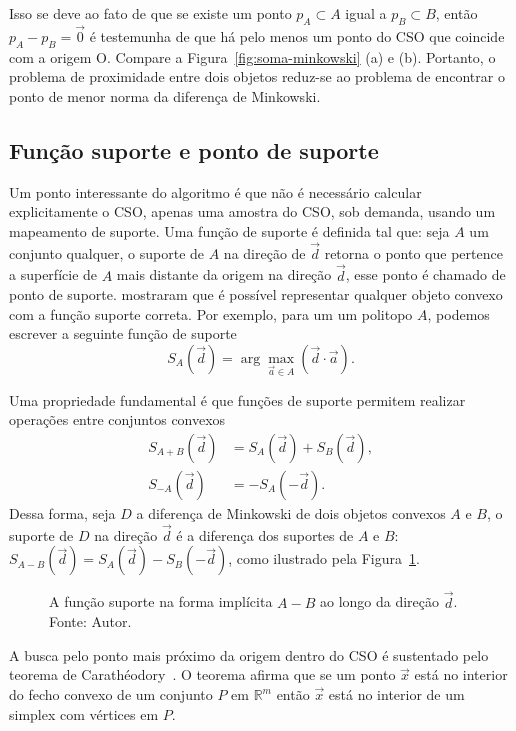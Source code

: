 Isso se deve ao fato de que se existe um ponto $p_A \subset A$ igual a $p_B \subset B$, então $p_A - p_B = \vec 0$ é testemunha de que há pelo menos um ponto do CSO que coincide com a origem O. Compare a Figura~\ref{fig:soma-minkowski} (a) e (b). Portanto, o problema de proximidade entre dois objetos reduz-se ao problema de encontrar o ponto de menor norma da diferença de Minkowski.

\subsection*{Função suporte e ponto de suporte}

Um ponto interessante do algoritmo é que não é necessário calcular explicitamente o CSO, apenas uma amostra do CSO, sob demanda, usando um mapeamento de suporte. Uma função de suporte é definida tal que: seja $A$ um conjunto qualquer, o suporte de $A$ na direção de $\vec d$ retorna o ponto que pertence a superfície de $A$ mais distante da origem na direção $\vec d$, esse ponto é chamado de ponto de suporte.  mostraram que é possível representar qualquer objeto convexo com a função suporte correta. Por exemplo, para um um politopo $A$, podemos escrever a seguinte função de suporte
\begin{equation}\label{eq:suporte}
S_A(\vec d) = \arg\max_{\vec a \in A} (\vec d \cdot \vec a).
\end{equation}

Uma propriedade fundamental é que funções de suporte permitem realizar operações entre conjuntos convexos
\begin{align*}
	S_{A+B} (\vec d) &= S_A (\vec d) + S_B (\vec d), \\
	S_{-A} (\vec d) &= -S_A (-\vec d).
\end{align*}
Dessa forma, seja $D$ a diferença de Minkowski de dois objetos convexos $A$ e $B$, o suporte de $D$ na direção $\vec d$ é a diferença dos suportes de $A$ e $B$: $S_{A-B} (\vec d) = S_A (\vec d) - S_B (-\vec d)$, como ilustrado pela Figura~\ref{fig:support_function}. 
\begin{figure}[htb]
	\centering
	
	\caption{A função suporte na forma implícita $A - B$ ao longo da direção $\vec d$. Fonte: Autor.}
	\label{fig:support_function}
\end{figure}

A busca pelo ponto mais próximo da origem dentro do CSO é sustentado pelo teorema de Carathéodory~\cite{ericson2004real}. O teorema afirma que se um ponto $\vec x$ está no interior do fecho convexo de um conjunto $P$ em $\mathbb{R}^m$ então $\vec x$ está no interior de um simplex com vértices em $P$.

